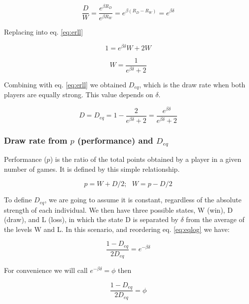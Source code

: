 \documentclass[12pt]{article}
\begin{document}
	\begin{equation} 
	\frac{D}{W} = \frac{e^{\beta R_{D}}}{e^{\beta R_{W}}}  = e^{\beta(R_{D}-R_{W})} = e^{\beta\delta}
	\end{equation}

Replacing into eq. \ref{eq:erll}

	\begin{equation} 
	1 = e^{\beta\delta} W + 2W
	\end{equation}

	\begin{equation} \label{eq:wdep}
	W = \frac{1}{e^{\beta\delta} + 2}
	\end{equation}

Combining with eq. \ref{eq:erll} we obtained $D_{eq}$, which is the draw rate when both players are equally strong. This value depends on $\delta$.

	\begin{equation} \label{eq:eqlog}
	D = D_{eq} = 1 - \frac {2}{e^{\beta\delta} + 2} = \frac{e^{\beta\delta}}{e^{\beta\delta}+2}
	\end{equation}

\subsubsection*{Draw rate from $p$ (performance) and $D_{eq}$}

Performance ($p$) is the ratio of the total points obtained by a player in a given number of games. 
It is defined by this simple relationship.

	\begin{equation} \label{eq:deq_perf}
	p = W + D/2;\:\:\: W = p - D/2
	\end{equation}

To define $D_{eq}$, we are going to assume it is constant, regardless of the absolute strength of each individual.
We then have three possible states, W (win), D (draw), and L (loss), in which the state D is separated by $\delta$ from the average of the levels W and L.
In this scenario, and reordering eq. \ref{eq:eqlog} we have:

	\begin{equation} \label{eq:deq0}
	\frac{1-D_{eq}}{2 D_{eq}} = e^{-\beta \delta}
	\end{equation}

For convenience we will call $e^{-\beta \delta} = \phi$ then

	\begin{equation} \label{eq:deq0b}
	\frac{1-D_{eq}}{2 D_{eq}} = \phi
	\end{equation}
\end{document}
